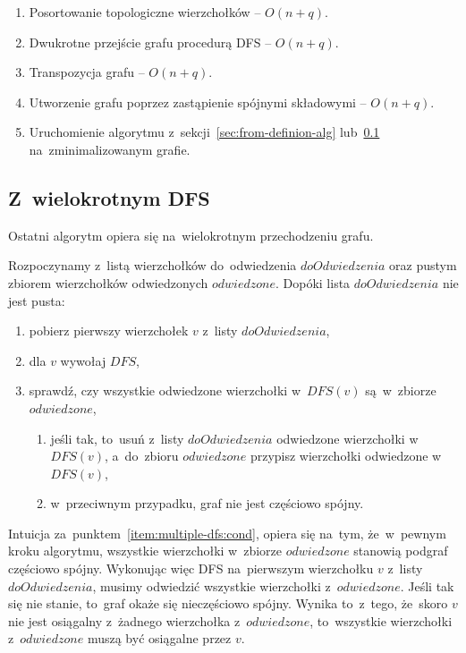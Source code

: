 \documentclass[a4paper,12pt]{mwart}
\begin{document}
\begin{enumerate}
\item Posortowanie topologiczne wierzchołków -- $O(n + q)$.
\item Dwukrotne przejście grafu procedurą DFS -- $O(n + q)$.
\item Transpozycja grafu -- $O(n + q)$.
\item Utworzenie grafu poprzez zastąpienie spójnymi składowymi -- $O(n + q)$.
\item Uruchomienie algorytmu z~sekcji~\ref{sec:from-definion-alg}
  lub~\ref{sec:multiple-dfs} na~zminimalizowanym grafie.
\end{enumerate}

\subsection{Z~wielokrotnym DFS}
\label{sec:multiple-dfs}

Ostatni algorytm opiera się na~wielokrotnym przechodzeniu grafu.

Rozpoczynamy z~listą wierzchołków do~odwiedzenia $doOdwiedzenia$ oraz pustym zbiorem
wierzchołków odwiedzonych $odwiedzone$. Dopóki lista $doOdwiedzenia$ nie jest pusta:
\begin{enumerate}
\item pobierz pierwszy wierzchołek $v$ z~listy $doOdwiedzenia$,
\item dla $v$ wywołaj $DFS$,
\item\label{item:multiple-dfs:cond} sprawdź, czy wszystkie odwiedzone
  wierzchołki w~$DFS(v)$ są~w~zbiorze $odwiedzone$,
\begin{enumerate}[label*=\arabic*.]
\item jeśli tak, to~usuń z~listy $doOdwiedzenia$ odwiedzone wierzchołki w~$DFS(v)$,
  a~do~zbioru $odwiedzone$ przypisz wierzchołki odwiedzone w~$DFS(v)$,
\item w~przeciwnym przypadku, graf nie jest częściowo spójny.
\end{enumerate}
\end{enumerate}

Intuicja za~punktem~\ref{item:multiple-dfs:cond}, opiera się na~tym,
że~w~pewnym kroku algorytmu, wszystkie wierzchołki w~zbiorze $odwiedzone$ stanowią
podgraf częściowo spójny. Wykonując więc DFS na~pierwszym wierzchołku $v$
z~listy $doOdwiedzenia$, musimy odwiedzić wszystkie wierzchołki z~$odwiedzone$. Jeśli
tak się nie stanie, to~graf okaże się nieczęściowo spójny. Wynika to~z~tego,
że~skoro $v$ nie jest osiągalny z~żadnego wierzchołka z~$odwiedzone$, to~wszystkie
wierzchołki z~$odwiedzone$ muszą być osiągalne przez $v$.
\end{document}
